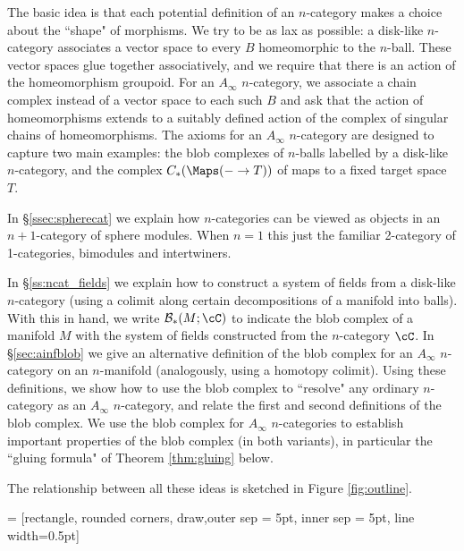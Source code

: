 The basic idea is that each potential definition of an $n$-category makes a choice about the ``shape" of morphisms.
We try to be as lax as possible: a disk-like $n$-category associates a 
vector space to every $B$ homeomorphic to the $n$-ball.
These vector spaces glue together associatively, and we require that there is an action of the homeomorphism groupoid.
For an $A_\infty$ $n$-category, we associate a chain complex instead of a vector space to 
each such $B$ and ask that the action of 
homeomorphisms extends to a suitably defined action of the complex of singular chains of homeomorphisms.
The axioms for an $A_\infty$ $n$-category are designed to capture two main examples: 
the blob complexes of $n$-balls labelled by a 
disk-like $n$-category, and the complex $\CM{-}{T}$ of maps to a fixed target space $T$.

In \S \ref{ssec:spherecat} we explain how $n$-categories can be viewed as objects in an $n{+}1$-category 
of sphere modules.
When $n=1$ this just the familiar 2-category of 1-categories, bimodules and intertwiners.

In \S \ref{ss:ncat_fields}  we explain how to construct a system of fields from a disk-like $n$-category 
(using a colimit along certain decompositions of a manifold into balls). 
With this in hand, we write $\bc_*(M; \cC)$ to indicate the blob complex of a manifold $M$ 
with the system of fields constructed from the $n$-category $\cC$. 
In \S \ref{sec:ainfblob} we give an alternative definition 
of the blob complex for an $A_\infty$ $n$-category on an $n$-manifold (analogously, using a homotopy colimit).
Using these definitions, we show how to use the blob complex to ``resolve" any ordinary $n$-category as an 
$A_\infty$ $n$-category, and relate the first and second definitions of the blob complex.
We use the blob complex for $A_\infty$ $n$-categories to establish important properties of the blob complex (in both variants), 
in particular the ``gluing formula" of Theorem \ref{thm:gluing} below.

The relationship between all these ideas is sketched in Figure \ref{fig:outline}.

 = [rectangle, rounded corners, draw,outer sep = 5pt, inner sep = 5pt, line width=0.5pt]

